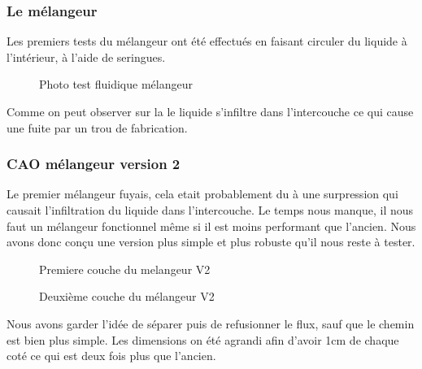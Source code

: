\documentclass[a4paper, 11pt]{article}
\begin{document}
\subsubsection{Le mélangeur}
Les premiers tests du mélangeur ont été effectués en faisant circuler du liquide à l'intérieur, à l'aide de seringues.
\begin{figure}[H]
    \centering
    \caption{Photo test fluidique mélangeur}
    \label{fig:fuite_melangeurV1}
\end{figure}
Comme on peut observer sur la \label{fig:fuite_melangeur} le liquide s'infiltre dans l'intercouche ce qui cause une fuite
par un trou de fabrication.
\subsubsection{CAO mélangeur version 2}
Le premier mélangeur fuyais, cela etait probablement du à une surpression qui causait
l'infiltration du liquide dans l'intercouche.
Le temps nous manque, il nous faut un mélangeur fonctionnel même si il est moins performant que l'ancien.
Nous avons donc conçu une version plus simple et plus robuste qu'il nous reste à tester.
\begin{multicols}{2}
    \begin{figure}[H]
        \centering
        \caption{Premiere couche du melangeur V2}
        \label{fig: CAO_melangeur_V2_couche1}
    \end{figure}
    \begin{figure}[H]
        \centering
        \caption{Deuxième couche du mélangeur V2}
        \label{fig:CAO_melangeur_V2_couche2}
    \end{figure}
\end{multicols}
Nous avons garder l'idée de séparer puis de refusionner le flux, sauf que le chemin est bien plus simple.
Les dimensions on été agrandi afin d'avoir 1cm de chaque coté ce qui est deux fois plus que l'ancien.
\end{document}
